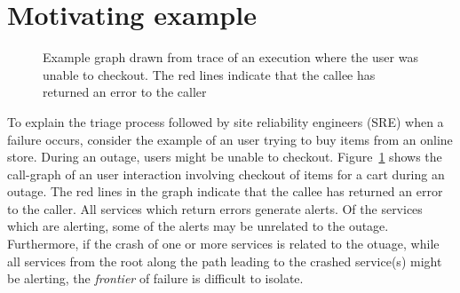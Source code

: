 \section{Motivating example}
\begin{figure}[h]
\caption{Example graph drawn from trace of an execution where the user was unable to checkout. The red lines indicate that the callee has returned an error to the caller}
\label{Failed_ex}
\end{figure}

To explain the triage process followed by site reliability engineers (SRE) when a failure occurs, consider the example of an user trying to buy items from an online store. 
During an outage, users might be unable to checkout. Figure~\ref{Failed_ex} shows the  call-graph of an user interaction involving checkout of items for a cart during an outage. The red lines in the graph indicate that the callee has returned an error to the caller. All services which return errors generate alerts. Of the services which are alerting, some of the alerts may be unrelated to the outage. Furthermore, if the crash of one or more services is related to the otuage, while all services from the root along the path leading to the crashed service(s) might be alerting,  the \textit{frontier} of failure is difficult to isolate.

